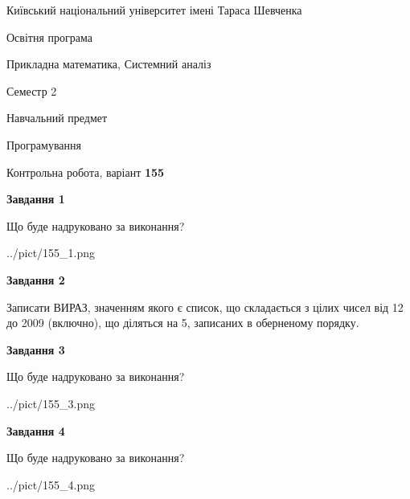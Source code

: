 \documentclass[12pt, ukrainian]{article}
\begin{document}
{{\begin {small}\par
{ \center  Київський національний університет імені Тараса Шевченка \par}
{\parbox {5 cm}{Освітня програма \hfill}{\parbox {8 cm}{Прикладна математика, Системний аналіз \hfill}}\parbox {5 cm}{\hfill Семестр 2}}\par
{\parbox {5 cm} {Навчальний предмет \hfill}\parbox {7 cm}{Програмування \hfill}\parbox {6cm}{\hfill}\par}\vspace{-7pt} \end{small}}{\center Контрольна робота, варіант  \No \textbf
{ 155 }\par}}
{
\begin {large}
{\begin {center}\textbf{Завдання 1}\end {center}}\par
Що буде надруковано за виконання?\par\par
\begin{center}
	{../pict/155_1.png}
\end{center}
\newpage

{\begin {center}\textbf{Завдання 2}\end {center}}\par

Записати ВИРАЗ, значенням якого є список, що складається з цілих чисел від 12 до 2009 (включно), що діляться на 5, записаних в обернено\-му порядку.\par
\newpage

{\begin {center}\textbf{Завдання 3}\end {center}}\par
Що буде надруковано за виконання?\par
\begin{center}
	{../pict/155_3.png}
\end{center}
\newpage

{\begin {center}\textbf{Завдання 4}\end {center}}\par
Що буде надруковано за виконання?\par
\begin{center}
	{../pict/155_4.png}
\end{center}
\newpage


\end{large}}
\end{document}
